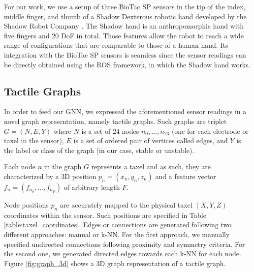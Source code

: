 For our work, we use a setup of three BioTac SP sensors in the tip of the index, middle finger, and thumb of a Shadow Dexterous robotic hand developed by the Shadow Robot Company \cite{ShadowRobotCompany2018}. The Shadow hand is an anthropomorphic hand with five fingers and $20$ \ac{DoF} in total. Those features allow the robot to reach a wide range of configurations that are comparable to those of a human hand. Its integration with the BioTac SP sensors is seamless since the sensor readings can be directly obtained using the \ac{ROS} \cite{Quigley2009} framework, in which the Shadow hand works.

\subsection{Tactile Graphs}
\label{cha:tactile:sec:tactilegcn:subsec:tactile-graphs}

In order to feed our \acl{GNN}, we expressed the aforementioned sensor readings in a novel graph representation, namely tactile graphs. Such graphs are triplet $G = (N, E, Y)$ where $N$ is a set of $24$ nodes ${n_0, ..., n_{23}}$ (one for each electrode or taxel in the sensor), $E$ is a set of ordered pair of vertices called edges, and $Y$ is the label or class of the graph (in our case, stable or unstable).

Each node $n$ in the graph $G$ represents a taxel and as such, they are characterized by a \acs{3D} position $p_n = (x_n, y_n, z_n)$ and a feature vector $f_n = (f_{n_0}, ..., f_{n_F})$ of arbitrary length $F$.

Node positions $p_n$ are accurately mapped to the physical taxel $(X, Y, Z)$ coordinates within the sensor. Such positions are specified in Table \ref{table:taxel_coordinates}. Edges or connections are generated following two different approaches: manual or \ac{k-NN}. For the first approach, we manually specified undirected connections following proximity and symmetry criteria. For the second one, we generated directed edges towards each \acl{k-NN} for each node. Figure \ref{fig:graph_3d} shows a \acs{3D} graph representation of a tactile graph.

